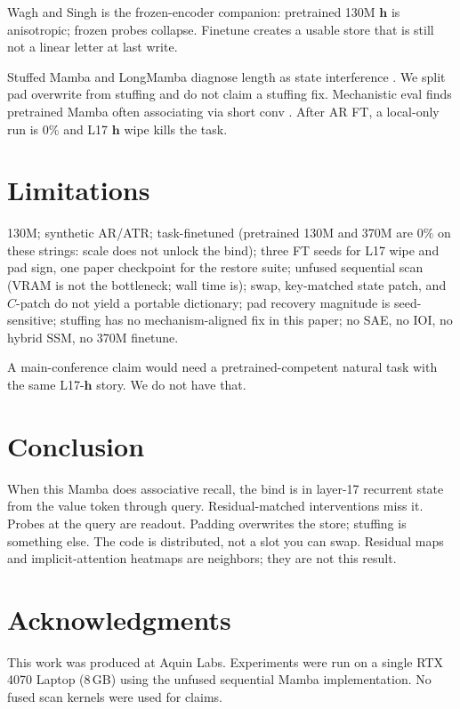 \documentclass[11pt]{article}
\begin{document}
Wagh and Singh \cite{wagh2026} is the frozen-encoder companion:
pretrained 130M $\mathbf{h}$ is anisotropic; frozen probes collapse.
Finetune creates a usable store that is still not a linear letter at last
write.

Stuffed Mamba and LongMamba diagnose length as state interference
\cite{stuffed2024,longmamba2024}.
We split pad overwrite from stuffing and do not claim a stuffing fix.
Mechanistic eval finds pretrained Mamba often associating via short conv
\cite{mecheval2025}.
After AR FT, a local-only run is $0\%$ and L17 $\mathbf{h}$ wipe
kills the task.

\section{Limitations}

130M; synthetic AR/ATR; task-finetuned (pretrained 130M and 370M are
$0\%$ on these strings: scale does not unlock the bind); three FT seeds
for L17 wipe and pad sign, one paper checkpoint for the restore suite;
unfused sequential scan (VRAM is not the bottleneck; wall time is);
swap, key-matched state patch, and $C$-patch do not yield a portable
dictionary; pad recovery magnitude is seed-sensitive; stuffing has no
mechanism-aligned fix in this paper; no SAE, no IOI, no hybrid SSM, no
370M finetune.

A main-conference claim would need a pretrained-competent natural task
with the same L17-$\mathbf{h}$ story.
We do not have that.

\section{Conclusion}

When this Mamba does associative recall, the bind is in layer-17
recurrent state from the value token through query.
Residual-matched interventions miss it.
Probes at the query are readout.
Padding overwrites the store; stuffing is something else.
The code is distributed, not a slot you can swap.
Residual maps and implicit-attention heatmaps are neighbors; they are not
this result.

\section*{Acknowledgments}
This work was produced at Aquin Labs.
Experiments were run on a single RTX 4070 Laptop (8\,GB) using the
unfused sequential Mamba implementation.
No fused scan kernels were used for claims.
\end{document}
